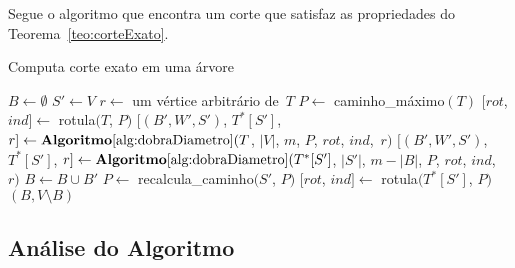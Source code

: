 		Segue o algoritmo que encontra um corte que satisfaz as 
		propriedades do Teorema~\ref{teo:corteExato}.
		
		\bigskip

		\begin{algorithm}[H]
		\label{alg:corteExato}

			\caption{Computa corte exato em uma árvore}
			$B\gets \emptyset$\;
			$S'\gets V$\;
			$r\gets$ um vértice arbitrário de~$T$\;
			$P\gets$ {\sc caminho\_máximo}$(T)$\;
			$[rot$, $ind]\gets$ {\sc rotula}$(T$, $P)$\;
			$[(B',W',S')$, $T^*[S']$, $r]\gets
				\mathbf {Algoritmo\ref{alg:dobraDiametro}}(T$,
				$|V|$, $m$, $P$, $rot$, $ind$,~$r)$\;
			{
				$[(B',W',S')$, $T^*[S']$, $r]\gets
					\mathbf {Algoritmo\ref{alg:dobraDiametro}}(T^*[S']$,
					$|S'|$, $m-|B|$, $P$, $rot$, $ind$,~$r)$\;
				$B\gets B\cup B'$\;
				$P\gets$ {\sc recalcula\_caminho}$(S'$, $P)$\;
				$[rot$, $ind]\gets$ {\sc rotula}$(T^*[S']$, $P)$
			}
			\Return $(B,V\setminus B)$\;

		\end{algorithm}	

		\bigskip

		\subsection*{Análise do Algoritmo}


